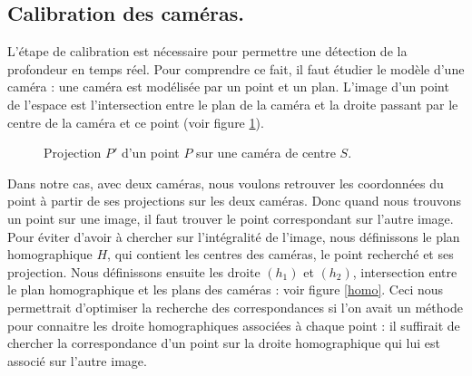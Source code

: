 \subsection{Calibration des caméras.}
L'étape de calibration est nécessaire pour permettre une détection de la profondeur en temps réel. Pour comprendre ce fait, il faut étudier le modèle d'une caméra : une caméra est modélisée par un point et un plan. L'image d'un point de l'espace est l'intersection entre le plan de la caméra et la droite passant par le centre de la caméra et ce point (voir figure \ref{projection}).

\begin{figure}
    \begin{center}
    \end{center}
    \caption{Projection $P'$ d'un point $P$ sur une caméra de centre $S$.}
    \label{projection}
\end{figure}

Dans notre cas, avec deux caméras, nous voulons retrouver les coordonnées du point à partir de ses projections sur les deux caméras. Donc quand nous trouvons un point sur une image, il faut trouver le point correspondant sur l'autre image. Pour éviter d'avoir à chercher sur l'intégralité de l'image, nous définissons le plan homographique $H$, qui contient les centres des caméras, le point recherché et ses projection. Nous définissons ensuite les droite $(h_1)$ et $(h_2)$, intersection entre le plan homographique et les plans des caméras : voir figure \ref{homo}. Ceci nous permettrait d'optimiser la recherche des correspondances si l'on avait un méthode pour connaitre les droite homographiques associées à chaque point : il suffirait de chercher la correspondance d'un point sur la droite homographique qui lui est associé sur l'autre image.

